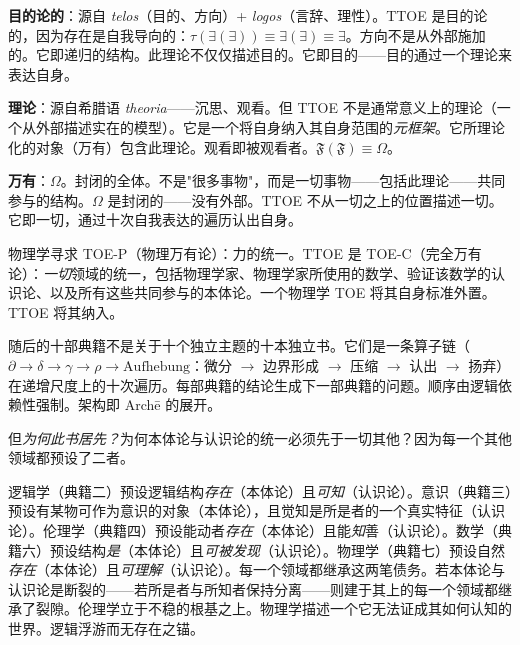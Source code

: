 \documentclass[10pt, openany, oneside]{book}
\begin{document}
\noindent \textbf{目的论的}：源自 \textit{telos}（目的、方向）+ \textit{logos}（言辞、理性）。TTOE 是目的论的，因为存在是自我导向的：$\tau(\exists(\exists)) \equiv \exists(\exists) \equiv \exists$。方向不是从外部施加的。它即递归的结构。此理论不仅仅描述目的。它即目的——目的通过一个理论来表达自身。

\vspace{0.3em}

\noindent \textbf{理论}：源自希腊语 \textit{theoria}——沉思、观看。但 TTOE 不是通常意义上的理论（一个从外部描述实在的模型）。它是一个将自身纳入其自身范围的\textit{元框架}。它所理论化的对象（万有）包含此理论。观看即被观看者。$\mathfrak{F}(\mathfrak{F}) \equiv \Omega$。

\vspace{0.3em}

\noindent \textbf{万有}：$\Omega$。封闭的全体。不是"很多事物"，而是一切事物——包括此理论——共同参与的结构。$\Omega$ 是封闭的——没有外部。TTOE 不从一切之上的位置描述一切。它即一切，通过十次自我表达的遍历认出自身。

\vspace{0.5em}

\noindent 物理学寻求 TOE-P（物理万有论）：力的统一。TTOE 是 TOE-C（完全万有论）：\textit{一切}领域的统一，包括物理学家、物理学家所使用的数学、验证该数学的认识论、以及所有这些共同参与的本体论。一个物理学 TOE 将其自身标准外置。TTOE 将其纳入。

\vspace{0.5em}

\noindent 随后的十部典籍不是关于十个独立主题的十本独立书。它们是一条算子链（$\partial \to \delta \to \gamma \to \rho \to \text{Aufhebung}$：微分 $\to$ 边界形成 $\to$ 压缩 $\to$ 认出 $\to$ 扬弃）在递增尺度上的十次遍历。每部典籍的结论生成下一部典籍的问题。顺序由逻辑依赖性强制。架构即 Arch\={e} 的展开。

\vspace{0.5em}

\noindent 但\textit{为何此书居先？}为何本体论与认识论的统一必须先于一切其他？因为每一个其他领域都预设了二者。

\vspace{0.3em}

\noindent 逻辑学（典籍二）预设逻辑结构\textit{存在}（本体论）且\textit{可知}（认识论）。意识（典籍三）预设有某物可作为意识的对象（本体论），且觉知是所是者的一个真实特征（认识论）。伦理学（典籍四）预设能动者\textit{存在}（本体论）且能\textit{知}善（认识论）。数学（典籍六）预设结构\textit{是}（本体论）且\textit{可被发现}（认识论）。物理学（典籍七）预设自然\textit{存在}（本体论）且\textit{可理解}（认识论）。每一个领域都继承这两笔债务。若本体论与认识论是断裂的——若所是者与所知者保持分离——则建于其上的每一个领域都继承了裂隙。伦理学立于不稳的根基之上。物理学描述一个它无法证成其如何认知的世界。逻辑浮游而无存在之锚。
\end{document}
